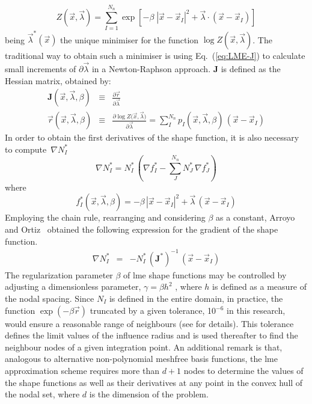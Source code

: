 \documentclass[preprint,12pt,a4paper]{elsarticle}
\newcommand{\tens}[1]{
  \ensuremath{\mathbf{{#1}}}
}
\begin{document}
\begin{equation}
  \label{eq:LME-Z}
Z(\vec{x}, {\vec{\lambda}}) = \sum_{I=1}^{N_n}{ \exp \left[ -\beta \; |\vec{x}-\vec{x}_I|^2 + \vec{\lambda} \cdot (\vec{x}-\vec{x}_I)  \right]}
\end{equation}
being $\vec{\lambda}^*(\vec{x})$ the unique minimiser for the function $\log
Z(\vec{x}, \vec{\lambda})$. The traditional way to obtain such a minimiser is using Eq.~(\ref{eq:LME-J}) to calculate small increments of $\partial\vec{\lambda}$ in a Newton-Raphson approach. $\tens{J}$ is defined as the Hessian matrix, obtained by:
\begin{eqnarray}
  \label{eq:LME-J} 
  \tens{J}(\vec{x}, \vec{\lambda},\beta) &\equiv& \frac{\partial
                                                  \vec{r}}{\partial \vec{\lambda}}\\
  \label{eq:LME-r}
  \vec{r}(\vec{x},\vec{\lambda},\beta) &\equiv& \frac{\partial \log{ Z(   \vec{x},\vec{\lambda}})}{\partial \vec{\lambda}}  = \sum_I^{N_n} p_I(\vec{x},\vec{\lambda},\beta) \, (\vec{x} - \vec{x}_I)
\end{eqnarray}
In order to obtain the first derivatives of the shape function, it is also necessary to compute~$\nabla N_I^*$
\begin{equation}
  \label{eq:LME-grad-p}
\nabla N_I^* = N^*_I  \, \left(\nabla f^*_I-\sum_J^{N_n} N^*_J \, \nabla f^*_J\right)
\end{equation}
where
\begin{equation}
  \label{eq:LME-f}
f^*_I(\vec{x},  \vec{\lambda},\beta)=-\beta \, |\vec{x}-\vec{x}_I|^2 + \vec{\lambda}   \,  (\vec{x}-\vec{x}_I)
\end{equation}
Employing the chain rule, rearranging and considering $\beta$ as a constant, Arroyo and Ortiz~\cite{Arroyo2006} obtained the following expression for the gradient of the shape function.
\begin{eqnarray}
\nabla N_I^* &=& -N_I^* \,  (\tens{J}^*)^{-1} \,  (\vec{x} - \vec{x}_I) \label{eq26} 
\end{eqnarray}
The regularization parameter $\beta$ of \acrshort{lme} shape functions may be
controlled by adjusting a dimensionless parameter, $\gamma=\beta h^2$
\cite{Arroyo2006}, where $h$ is defined as a measure of the nodal
spacing. 
Since $N_I$ is defined in the entire domain, in practice, the
function $\exp(-\beta \vec{r} )$ truncated  by  a given tolerance,
10$^{-6}$ in this research,  would ensure a reasonable range of
neighbours (see \cite{Arroyo2006} for details).
This tolerance defines the limit values of the influence radius and is used thereafter to
find the neighbour nodes of a given integration point. An additional remark is that, analogous to alternative non-polynomial meshfree basis functions, the \acrshort{lme} approximation scheme requires more than $d+1$ nodes to determine the values of the shape functions as well as their derivatives at any point in the convex hull of the nodal set, where $d$ is the dimension of the problem.
\end{document}
